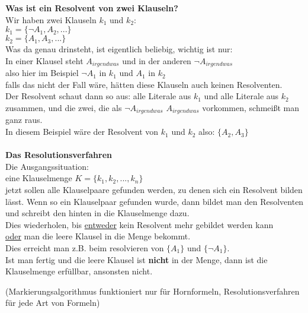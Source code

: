 \documentclass[a4paper]{scrartcl}
\begin{document}
\textbf{Was ist ein Resolvent von zwei Klauseln?}\\

Wir haben zwei Klauseln $k_1$ und $k_2$:\\
$k_1 = \{ \neg A_1, A_2, ... \}$\\
$k_2 = \{ A_1, A_3, ... \}$\\

Was da genau drinsteht, ist eigentlich beliebig, wichtig ist nur:\\
In einer Klausel steht $A_{irgendwas}$ und in der anderen $\neg A_{irgendwas}$\\
also hier im Beispiel $\neg A_1$ in $k_1$ und $A_1$ in $k_2$\\
falls das nicht der Fall wäre, hätten diese Klauseln auch keinen Resolventen.\\

Der Resolvent schaut dann so aus: alle Literale aus $k_1$ und alle Literale aus $k_2$ zusammen, und die zwei, die als $\neg A_{irgendwas}$ $A_{irgendwas}$ vorkommen, schmeißt man ganz raus.\\
In diesem Beispiel wäre der Resolvent von $k_1$ und $k_2$ also: $\{A_2, A_3\}$\\
\\

\textbf{Das Resolutionsverfahren}\\

Die Ausgangssituation:\\
eine Klauselmenge $K = \{ k_1, k_2, ..., k_n \}$\\

jetzt sollen alle Klauselpaare gefunden werden, zu denen sich ein Resolvent bilden lässt. Wenn so ein Klauselpaar gefunden wurde, dann bildet man den Resolventen und schreibt den hinten in die Klauselmenge dazu.\\

Dies wiederholen, bis \underline{entweder} kein Resolvent mehr gebildet werden kann\\
\underline{oder} man die leere Klausel in die Menge bekommt.\\
Dies erreicht man z.B. beim resolvieren von $\{ A_1 \} $ und $\{ \neg A_1\}$.\\

Ist man fertig und die leere Klausel ist \textbf{nicht} in der Menge, dann ist die Klauselmenge erfüllbar, ansonsten nicht.\\

\begin{small}
(Markierungsalgorithmus funktioniert nur für Hornformeln, Resolutionsverfahren für jede Art von Formeln)
\end{small}
\end{document}
